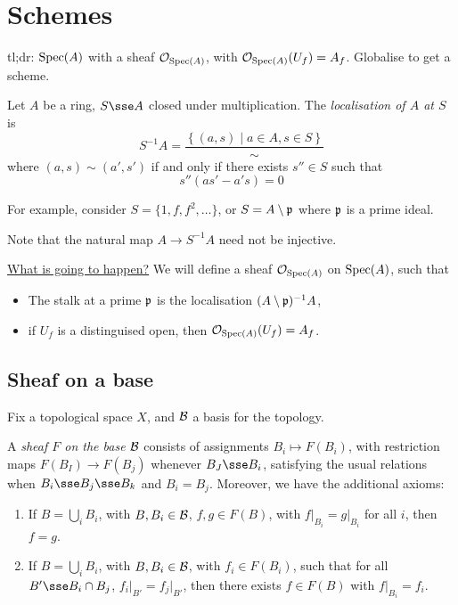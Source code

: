 \documentclass{article}
\begin{document}
\section{Schemes}

tl;dr: \(\operatorname{Spec}(A)\) with a sheaf \(\mathcal{O}_{\operatorname{Spec}(A)}\), with \(\mathcal{O}_{\operatorname{Spec}(A)}(U_f) = A_f\). Globalise to get a scheme.

\begin{definition}
    [localisation]
    Let \(A\) be a ring, \(S \sse A\) closed under multiplication. The \emph{localisation of \(A\) at \(S\)} is
    \[S^{-1}A = \frac{\left\{(a, s) \mid a \in A, s \in S\right\}}{\sim}\]
    where \((a, s) \sim (a', s')\) if and only if there exists \(s'' \in S\) such that
    \[s''(as' - a's) = 0\]
\end{definition}

For example, consider \(S = \{1, f, f^2, \dots\}\), or \(S = A \setminus \mathfrak{p}\) where \(\mathfrak{p}\) is a prime ideal.

\begin{remark}
    Note that the natural map \(A \to S^{-1}A\) need not be injective.
\end{remark}

\underline{What is going to happen?} We will define a sheaf \(\mathcal{O}_{\operatorname{Spec}(A)}\) on \(\operatorname{Spec}(A)\), such that
\begin{itemize}
    \item The stalk at a prime \(\mathfrak{p}\) is the localisation \((A \setminus \mathfrak{p})^{-1}A\),
    \item if \(U_f\) is a distinguised open, then \(\mathcal{O}_{\operatorname{Spec}(A)}(U_f) = A_f\).
\end{itemize}

\subsection{Sheaf on a base}

Fix a topological space \(X\), and \(\mathcal{B}\) a basis for the topology.

\begin{definition}
    A \emph{sheaf \(F\) on the base \(\mathcal{B}\)} consists of assignments \(B_i \mapsto F(B_i)\), with restriction maps \(F(B_I) \to F(B_j)\) whenever \(B_J \sse B_i\), satisfying the usual relations when \(B_i \sse B_j \sse B_k\) and \(B_i = B_j\). Moreover, we have the additional axioms:
    \begin{enumerate}[label=SB\arabic*.]
        \item If \(B = \bigcup_i B_i\), with \(B, B_i \in \mathcal{B}\), \(f, g \in F(B)\), with \(f\vert_{B_i} = g\vert_{B_i}\) for all \(i\), then \(f = g\).
        \item If \(B = \bigcup_i B_i\), with \(B, B_i \in \mathcal{B}\), with \(f_i \in F(B_i)\), such that for all \(B' \sse B_i \cap B_j\), \(f_i \vert_{B'} = f_j \vert_{B'}\), then there exists \(f \in F(B)\) with \(f\vert_{B_i} = f_i\).
    \end{enumerate}
\end{definition}
\end{document}
